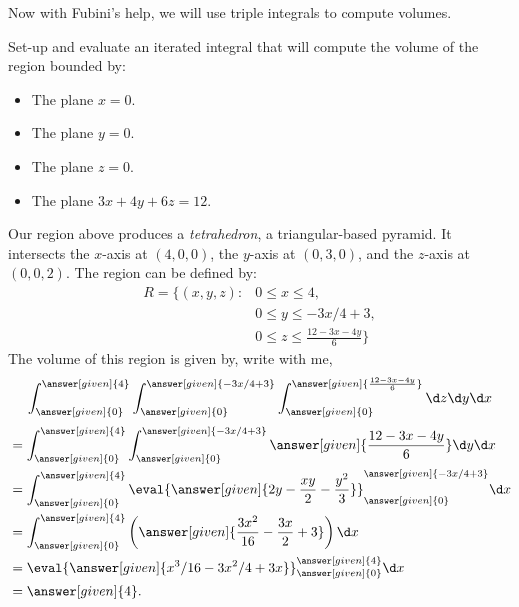 \documentclass{ximera}
\begin{document}
Now with Fubini's help, we will use triple integrals to compute
volumes.

\begin{example}
  Set-up and evaluate an iterated integral that will compute the
  volume of the region bounded by:
  \begin{itemize}
  \item The plane $x=0$.
  \item The plane $y=0$.
  \item The plane $z=0$.
  \item The plane $3x + 4y + 6z = 12$.
  \end{itemize}
  \begin{explanation}
    Our region above produces a
    \textit{tetrahedron}, a triangular-based
    pyramid. It intersects the $x$-axis at $(4,0,0)$, the $y$-axis at
    $(0,3,0)$, and the $z$-axis at $(0,0,2)$.  The region can be
    defined by:
    \begin{align*}
      R=\Big\{(x,y,z):&0\leq x\leq 4, \\
      &0\leq y\leq -3x/4+3, \\
      &0\leq z \leq \frac{12-3x-4y}{6}\Big\}
    \end{align*}
    The volume of this region is given by, write with me, 
    \[
    \int_{\answer[given]{0}}^{\answer[given]{4}} \int_{\answer[given]{0}}^{\answer[given]{-3x/4+3}} \int_{\answer[given]{0}}^{\answer[given]{\frac{12-3x-4y}{6}}}\d z \d y\d x 
    \]
    \begin{align*}
      &=\int_{\answer[given]{0}}^{\answer[given]{4}} \int_{\answer[given]{0}}^{\answer[given]{-3x/4+3}} \answer[given]{\frac{12-3x-4y}{6}} \d y \d x\\
      &= \int_{\answer[given]{0}}^{\answer[given]{4}}  \eval{\answer[given]{2y-\frac{xy}{2}-\frac{y^2}{3}}}_{\answer[given]{0}}^{\answer[given]{-3x/4+3}} \d x\\
      &= \int_{\answer[given]{0}}^{\answer[given]{4}}  \left(\answer[given]{\frac{3x^2}{16} -\frac{3x}{2}+3}\right) \d x\\
      &= \eval{\answer[given]{x^3/16-3x^2/4+3x}}_{\answer[given]{0}}^{\answer[given]{4}} \d x\\
      &=\answer[given]{4}.
    \end{align*}    
  \end{explanation}
\end{example}
\end{document}
